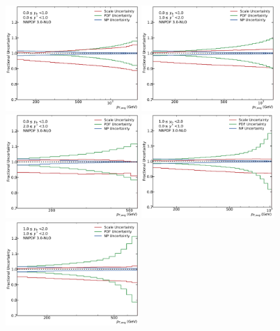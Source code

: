 \begin{figure}[htp]
    \centering
    \includegraphics[width=0.45\textwidth]{figures/theory/theo_unc_yb0ys0.pdf}\hfill
    \includegraphics[width=0.45\textwidth]{figures/theory/theo_unc_yb0ys1.pdf}
    \includegraphics[width=0.45\textwidth]{figures/theory/theo_unc_yb0ys2.pdf}\hfill
    \includegraphics[width=0.45\textwidth]{figures/theory/theo_unc_yb1ys0.pdf}
    \includegraphics[width=0.45\textwidth]{figures/theory/theo_unc_yb1ys1.pdf}\hfill

\end{figure}
